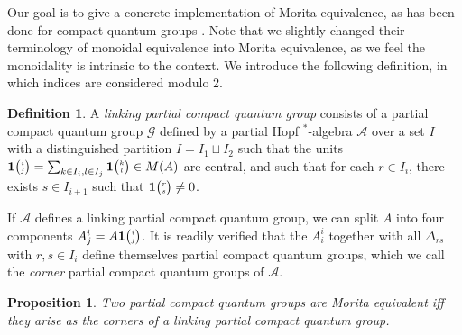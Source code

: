 \documentclass[10pt]{article}
\newcommand{\Grt}[3]{#1{\tiny {\begin{pmatrix} #2\\#3\end{pmatrix}}}}
\newcommand{\UnitC}[2]{\Grt{\mathbf{1}}{#1}{#2}}
\newtheorem{Prop}[Theorem]{Proposition}
\theoremstyle{definition}
\newtheorem{Def}[Theorem]{Definition}
\numberwithin{equation}{section}
\begin{document}
Our goal is to give a concrete implementation of Morita equivalence, as has been done for compact quantum groups \cite{BDV1}. Note that we slightly changed their terminology of monoidal equivalence into Morita equivalence, as we feel the monoidality is intrinsic to the context. We introduce the following definition, in which indices are considered modulo 2. 

\begin{Def} A \emph{linking partial compact quantum group} consists of a partial compact quantum group $\mathscr{G}$ defined by a partial Hopf $^*$-algebra $\mathscr{A}$ over a set $I$ with a distinguished partition $I = I_1\sqcup I_2$ such that the units $\UnitC{i}{j} = \sum_{k\in I_i,l\in I_j} \UnitC{k}{l} \in M(A)$ are central, and such that for each $r\in I_i$, there exists $s\in I_{i+1}$ such that $\UnitC{r}{s}\neq 0$.
\end{Def}

If $\mathscr{A}$ defines a linking partial compact quantum group, we can split $A$ into four components $A^i_j = A\UnitC{i}{j}$. It is readily verified that the $A^i_i$ together with all $\Delta_{rs}$ with $r,s \in I_i$ define themselves partial compact quantum groups, which we call the \emph{corner} partial compact quantum groups of $\mathscr{A}$. 

\begin{Prop} Two partial compact quantum groups are Morita equivalent iff they arise as the corners of a linking partial compact quantum group.
\end{Prop}
\end{document}
